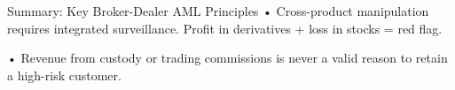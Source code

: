 \documentclass[11pt,a4paper]{beamer}
\begin{document}
\begin{frame}{Summary: Key Broker-Dealer AML Principles}
\vspace{0.1cm}
\noindent• Cross-product manipulation requires integrated surveillance. Profit in derivatives + loss in stocks = red flag.

\vspace{0.1cm}
\noindent• Revenue from custody or trading commissions is never a valid reason to retain a high-risk customer.

\vspace{0.3cm}
\centering
{}
\end{frame}
\end{document}
